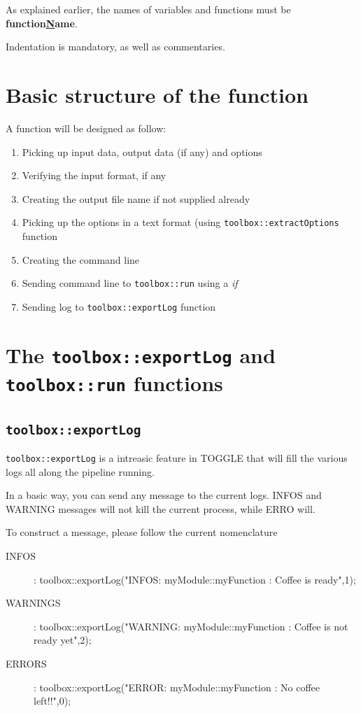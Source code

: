 \documentclass[a4paper,10pt]{report}
\begin{document}
As explained earlier, the names of variables and functions must be \textbf{function\underline{N}ame}.

Indentation is mandatory, as well as commentaries.

\section{Basic structure of the function}

A function will be designed as follow:
\begin{enumerate}
 \item Picking up input data, output data (if any) and options
 \item Verifying the input format, if any
 \item Creating the output file name if not supplied already
 \item Picking up the options in a text format (using \texttt{toolbox::extractOptions} function
 \item Creating the command line
 \item Sending command line to \texttt{toolbox::run} using a \textit{if}
 \item Sending log to \texttt{toolbox::exportLog} function
\end{enumerate}

\section{The \texttt{toolbox::exportLog} and \texttt{toolbox::run} functions}

\subsection{\texttt{toolbox::exportLog}}

\texttt{toolbox::exportLog} is a intreasic feature in TOGGLE that will fill the various logs all along the pipeline running.

In a basic way, you can send any message to the current logs. INFOS and WARNING messages will not kill the current process, while ERRO will.

To construct a message, please follow the current nomenclature

\begin{description}
 \item [INFOS]: toolbox::exportLog("INFOS: myModule::myFunction : Coffee is ready",1);
 \item [WARNINGS]: toolbox::exportLog("WARNING: myModule::myFunction : Coffee is not ready yet",2);
 \item [ERRORS]: toolbox::exportLog("ERROR: myModule::myFunction : No coffee left!!",0);
\end{description}
\end{document}
